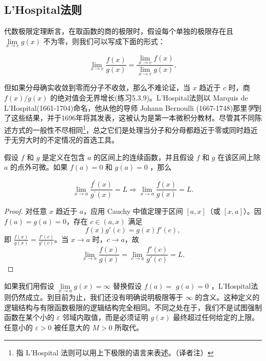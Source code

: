 \subsection{L'Hospital法则}

代数极限定理断言，在取函数的商的极限时，假设每个单独的极限存在且 \(\mathop{\lim }\limits_{{x \rightarrow  c}}g\left( x\right)\) 不为零，则我们可以写成下面的形式：

\[
\mathop{\lim }\limits_{{x \rightarrow  c}}\frac{f\left( x\right) }{g\left( x\right) } = \frac{\mathop{\lim }\limits_{{x \rightarrow  c}}f\left( x\right) }{\mathop{\lim }\limits_{{x \rightarrow  c}}g\left( x\right) },
\]

但如果分母确实收敛到零而分子不收敛，那么不难论证，当 \(x\) 趋近于 \(c\) 时，商 \(f\left( x\right) /g\left( x\right)\) 的绝对值会无界增长(练习5.3.9)。L'Hospital法则以 Marquis de L'Hospital(1661-1704)命名，他从他的导师 Johann Bernoulli (1667-1748)那里\textit{学}到了这些结果，并于1696年将其发表，这被认为是第一本微积分教材。尽管其不同陈述方式的一般性不尽相同\footnote{指 L'Hospital 法则可以用上下极限的语言来表述。（译者注）}，总之它们是处理当分子和分母都趋近于零或同时趋近于无穷大时的不定情况的首选工具。

\begin{Thm}[L'Hospital法则: \(0/0\) 型]
  \label{thm:5.3.6}
假设 \(f\) 和 \(g\) 是定义在包含 \(a\) 的区间上的连续函数，并且假设 \(f\) 和 \(g\) 在该区间上除 $a$ 的点外可微。如果 \(f\left( a\right)  = 0\) 和 \(g\left( a\right)  = 0\) ，那么

\[
\mathop{\lim }\limits_{{x \rightarrow  a}}\frac{{f}^{\prime }\left( x\right) }{{g}^{\prime }\left( x\right) } = L \Rightarrow \mathop{\lim }\limits_{{x \rightarrow  a}}\frac{f\left( x\right) }{g\left( x\right) } = L.
\]  
\end{Thm}

\begin{proof}
  对任意 \(x\) 趋近于 \(a\)，应用 Cauchy 中值定理于区间 \([a, x]\)（或 \([x, a]\)）。因 \(f(a) = g(a) = 0\)，存在 \(c \in (a, x)\) 满足
  \[
  f(x)g'(c) = g(x)f'(c),
  \]
  即 \(\frac{f(x)}{g(x)} = \frac{f'(c)}{g'(c)}\)。当 \(x \rightarrow a\) 时，\(c \rightarrow a\)，故
  \[
  \lim_{x \rightarrow a} \frac{f(x)}{g(x)} = \lim_{c \rightarrow a} \frac{f'(c)}{g'(c)} = L.
  \]
\end{proof}


如果我们用假设 \(\mathop{\lim }\limits_{{x \rightarrow  a}}g\left( x\right)  = \infty\) 替换假设 \(f\left( a\right)  =\)  \(g\left( a\right)  = 0\) ，L'Hospital法则仍然成立。到目前为止，我们还没有明确说明极限等于 \(\infty\) 的含义。这种定义的逻辑结构与有限函数极限的逻辑结构完全相同。不同之处在于，我们不是试图强制函数在某个小的 \(\varepsilon\) 邻域内取值，而是必须证明 \(g\left( x\right)\) 最终超过任何给定的上限。任意小的 \(\varepsilon  > 0\) 被任意大的 \(M > 0\) 所取代。

